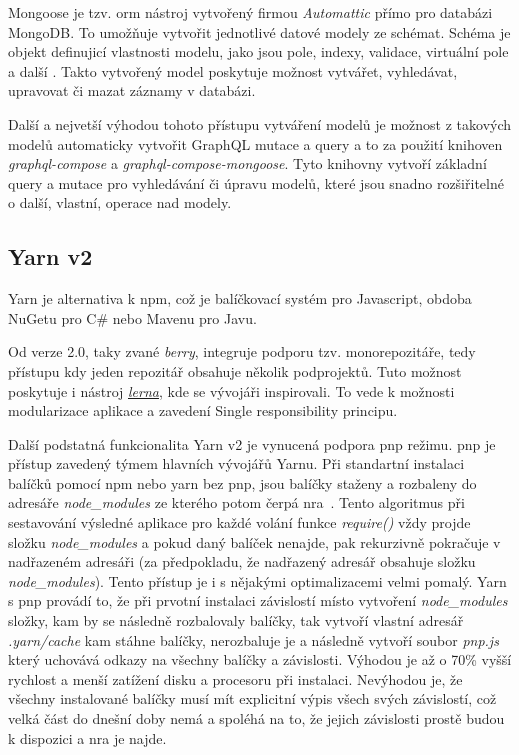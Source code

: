 Mongoose je tzv. \acrfull{orm} nástroj vytvořený firmou \emph{Automattic} přímo pro databázi MongoDB. To umožňuje vytvořit jednotlivé datové modely ze schémat. Schéma je objekt definujicí vlastnosti modelu, jako jsou pole, indexy, validace, virtuální pole a další \cite{automatticinc_2020_mongoose}. Takto vytvořený model poskytuje možnost vytvářet, vyhledávat, upravovat či mazat záznamy v databázi.

Další a nejvetší výhodou tohoto přístupu vytváření modelů je možnost z takových modelů automaticky vytvořit GraphQL mutace a query a to za použití knihoven \emph{graphql-compose} a \emph{graphql-compose-mongoose}. Tyto knihovny vytvoří základní query a mutace pro vyhledávání či úpravu modelů, které jsou snadno rozšiřitelné o další, vlastní, operace nad modely.

\subsection{Yarn v2}
\label{ss:yarn}
Yarn je alternativa k \acrshort{npm}, což je balíčkovací systém pro Javascript, obdoba NuGetu pro C\# nebo Mavenu pro Javu.

Od verze 2.0, taky zvané \emph{berry}, integruje podporu tzv. monorepozitáře, tedy přístupu kdy jeden repozitář obsahuje několik podprojektů. Tuto možnost poskytuje i nástroj \href{https://github.com/lerna/lerna}{\emph{lerna}}, kde se vývojáři  inspirovali. To vede k možnosti modularizace aplikace a zavedení Single responsibility principu.

Další podstatná funkcionalita Yarn v2 je vynucená podpora \acrfull{pnp} režimu. \acrshort{pnp} je přístup zavedený týmem hlavních vývojářů Yarnu. Při standartní instalaci balíčků pomocí npm nebo yarn bez pnp, jsou balíčky staženy a rozbaleny do adresáře \emph{node\_modules} ze kterého potom čerpá \acrfull{nra}~\cite{joyentinc_1_noderesolutionalgorithm}. Tento algoritmus při sestavování výsledné aplikace pro každé volání funkce \emph{require()} vždy projde složku \emph{node\_modules} a pokud daný balíček nenajde, pak rekurzivně pokračuje v nadřazeném adresáři (za předpokladu, že nadřazený adresář obsahuje složku \emph{node\_modules}). Tento přístup je i s nějakými optimalizacemi velmi pomalý. Yarn s \acrshort{pnp} provádí to, že při prvotní instalaci závislostí místo vytvoření \emph{node\_modules} složky, kam by se následně rozbalovaly balíčky, tak vytvoří vlastní adresář \emph{.yarn/cache} kam stáhne balíčky, nerozbaluje je a následně vytvoří soubor \emph{pnp.js} který uchovává odkazy na všechny balíčky a závislosti. Výhodou je až o 70\% vyšší rychlost a menší zatížení disku a procesoru při instalaci. Nevýhodou je, že všechny instalované balíčky musí mít explicitní výpis všech svých závislostí, což velká část do dnešní doby nemá a spoléhá na to, že jejich závislosti prostě budou k dispozici a \acrshort{nra} je najde.

